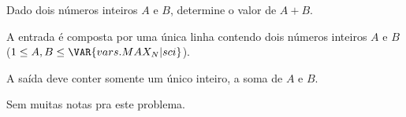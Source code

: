 Dado dois números inteiros $A$ e $B$, determine o valor de $A + B$.

A entrada é composta por uma única linha contendo dois números
inteiros $A$ e $B$ ($1 \leq A, B \leq \VAR{vars.MAX_N | sci}$).

A saída deve conter somente um único inteiro, a soma de $A$ e $B$.

Sem muitas notas pra este problema.
